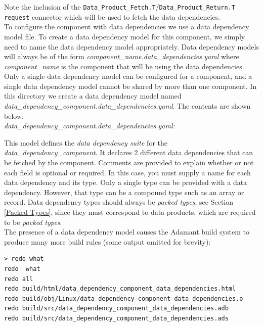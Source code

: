 Note the inclusion of the \texttt{Data\_Product\_Fetch.T}/\texttt{Data\_Product\_Return.T} \texttt{request} connector which will be used to fetch the data dependencies. \\

To configure the component with data dependencies we use a data dependency model file. To create a data dependency model for this component, we simply need to name the data dependency model appropriately. Data dependency models will always be of the form \textit{component\_name.data\_dependencies.yaml} where \textit{component\_name} is the component that will be using the data dependencies. Only a single data dependency model can be configured for a component, and a single data dependency model cannot be shared by more than one component. In this directory we create a data dependency model named \textit{data\_dependency\_component.data\_dependencies.yaml}. The contents are shown below: \\

\textit{data\_dependency\_component.data\_dependencies.yaml:}

This model defines the \textit{data dependency suite} for the \textit{data\_dependency\_component}. It declares 2 different data dependencies that can be fetched by the component. Comments are provided to explain whether or not each field is optional or required. In this case, you must supply a name for each data dependency and its type. Only a single type can be provided with a data dependency. However, that type can be a compound type such as an array or record. Data dependency types should always be \textit{packed types}, see Section \ref{Packed Types}, since they must correspond to data products, which are required to be \textit{packed types}. \\

The presence of a data dependency model causes the Adamant build system to produce many more build rules (some output omitted for brevity):

\vspace{5mm} %
\begin{verbatim}
> redo what 
redo  what
redo all
redo build/html/data_dependency_component_data_dependencies.html
redo build/obj/Linux/data_dependency_component_data_dependencies.o
redo build/src/data_dependency_component_data_dependencies.adb
redo build/src/data_dependency_component_data_dependencies.ads
\end{verbatim}
\vspace{5mm} %

